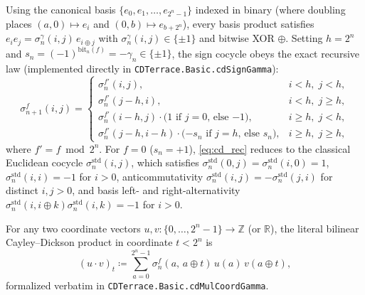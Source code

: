 \documentclass[11pt,reqno]{amsart}
\newcommand{\code}[1]{\textnormal{\texttt{\small\nolinkurl{#1}}}}
\theoremstyle{plain}
\theoremstyle{definition}
\theoremstyle{remark}
\newcommand{\R}{\mathbb{R}}
\newcommand{\Z}{\mathbb{Z}}
\newcommand{\std}{\mathrm{std}}
\begin{document}
Using the canonical basis $\{e_0, e_1, \dots, e_{2^n-1}\}$ indexed in binary (where doubling
places $(a, 0) \mapsto e_i$ and $(0, b) \mapsto e_{b + 2^n}$), every basis product satisfies
$e_i e_j = \sigma_n^\gamma(i, j)\, e_{i \oplus j}$ with $\sigma_n^\gamma(i, j) \in \{\pm 1\}$
and bitwise XOR $\oplus$. Setting $h = 2^n$ and $s_n = (-1)^{\mathrm{bit}_n(f)} = -\gamma_n \in \{\pm 1\}$,
the sign cocycle obeys the exact recursive law (implemented directly in \code{CDTerrace.Basic.cdSignGamma}):
\begin{equation}
\label{eq:cd_rec}
  \sigma_{n+1}^{f}(i, j) =
  \begin{cases}
    \sigma_n^{f'}(i, j), & i < h,\; j < h, \\
    \sigma_n^{f'}(j - h, i), & i < h,\; j \ge h, \\
    \sigma_n^{f'}(i - h, j)\cdot \bigl(\text{$1$ if $j=0$, else $-1$}\bigr), & i \ge h,\; j < h, \\
    \sigma_n^{f'}(j - h, i - h)\cdot \bigl(\text{$-s_n$ if $j=h$, else $s_n$}\bigr), & i \ge h,\; j \ge h,
  \end{cases}
\end{equation}
where $f' = f \bmod 2^n$. For $f = 0$ ($s_n = +1$), \eqref{eq:cd_rec} reduces to the classical
Euclidean cocycle $\sigma_n^{\std}(i, j)$, which satisfies $\sigma_n^{\std}(0, j) = \sigma_n^{\std}(i, 0) = 1$,
$\sigma_n^{\std}(i, i) = -1$ for $i > 0$, anticommutativity
$\sigma_n^{\std}(i, j) = -\sigma_n^{\std}(j, i)$ for distinct $i, j > 0$, and basis left- and
right-alternativity $\sigma_n^{\std}(i, i \oplus k)\sigma_n^{\std}(i, k) = -1$ for $i > 0$.

For any two coordinate vectors $u, v : \{0, \dots, 2^n-1\} \to \Z$ (or $\R$), the literal
bilinear Cayley--Dickson product in coordinate $t < 2^n$ is
\begin{equation}
\label{eq:cd_mul_coord}
  (u \cdot v)_t \coloneqq \sum_{a = 0}^{2^n - 1} \sigma_n^{f}(a,\, a \oplus t)\, u(a)\, v(a \oplus t),
\end{equation}
formalized verbatim in \code{CDTerrace.Basic.cdMulCoordGamma}.
\end{document}
